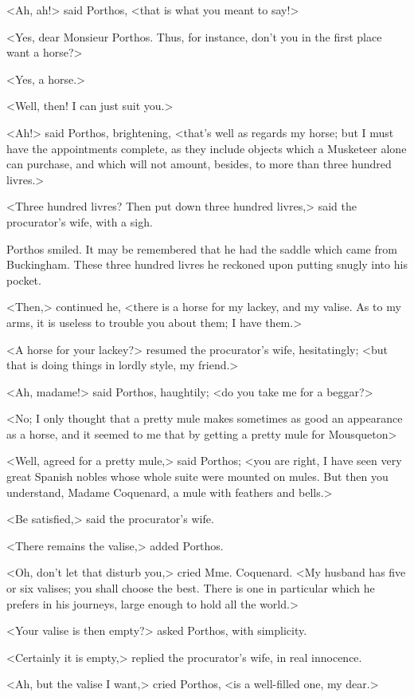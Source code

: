 <Ah, ah!> said Porthos, <that is what you meant to say!> 

<Yes, dear Monsieur Porthos. Thus, for instance, don't you in the first place want a horse?> 

<Yes, a horse.> 

<Well, then! I can just suit you.> 

<Ah!> said Porthos, brightening, <that's well as regards my horse; but I must have the appointments complete, as they include objects which a Musketeer alone can purchase, and which will not amount, besides, to more than three hundred livres.> 

<Three hundred livres? Then put down three hundred livres,> said the procurator's wife, with a sigh. 

Porthos smiled. It may be remembered that he had the saddle which came from Buckingham. These three hundred livres he reckoned upon putting snugly into his pocket. 

<Then,> continued he, <there is a horse for my lackey, and my valise. As to my arms, it is useless to trouble you about them; I have them.> 

<A horse for your lackey?> resumed the procurator's wife, hesitatingly; <but that is doing things in lordly style, my friend.> 

<Ah, madame!> said Porthos, haughtily; <do you take me for a beggar?> 

<No; I only thought that a pretty mule makes sometimes as good an appearance as a horse, and it seemed to me that by getting a pretty mule for Mousqueton\longdash> 

<Well, agreed for a pretty mule,> said Porthos; <you are right, I have seen very great Spanish nobles whose whole suite were mounted on mules. But then you understand, Madame Coquenard, a mule with feathers and bells.> 

<Be satisfied,> said the procurator's wife. 

<There remains the valise,> added Porthos. 

<Oh, don't let that disturb you,> cried Mme. Coquenard. <My husband has five or six valises; you shall choose the best. There is one in particular which he prefers in his journeys, large enough to hold all the world.> 

<Your valise is then empty?> asked Porthos, with simplicity. 

<Certainly it is empty,> replied the procurator's wife, in real innocence. 

<Ah, but the valise I want,> cried Porthos, <is a well-filled one, my dear.> 

